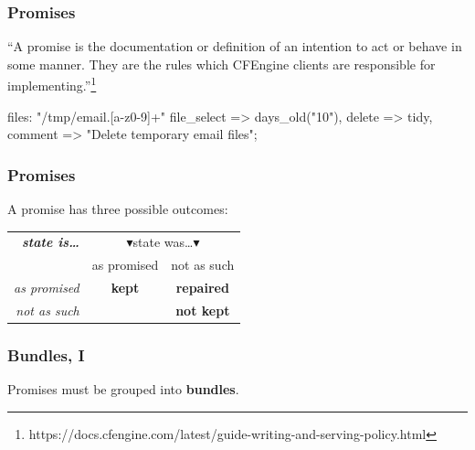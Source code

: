 \documentclass[english,serif,mathserif,usenames,dvipsnames]{beamer}
\begin{document}
\begin{frame}[fragile]
  \frametitle{Promises}
  ``A promise is the documentation or definition of an intention to
  act or behave in some manner. They are the rules which CFEngine
  clients are responsible for implementing.''\footnote{%
    https://docs.cfengine.com/latest/guide-writing-and-serving-policy.html
  }%

  \begin{semiverbatim}
files:
  \alert<2>{"/tmp/email.[a-z0-9]+"}
  \alert<3>{file_select   => days_old("10"),}
  \alert<4>{delete        => tidy,}
  comment       => "Delete temporary email files";
\end{semiverbatim}

\+
\end{frame}


\begin{frame}
  \frametitle{Promises}
  \begin{center}
    \newcommand\DN{$\blacktriangledown$}

    A promise has three possible outcomes:

    \+
    \begin{tabular}{>{\em}rcc}
    {\bf state is\ldots}    & \multicolumn{2}{c}{\DN state was\ldots \DN} \\
    \multicolumn{1}{c}{\DN} & as promised  & not as such                  \\
    as promised             & {\color{green}\bf kept}
                                           & {\color{violet}\bf repaired}   \\
    not as such             &              & {\color{red}\bf not kept}    \\
    \end{tabular}
  \end{center}
\end{frame}


\begin{frame}[fragile]
  \frametitle{Bundles, I}

  Promises must be grouped into \textbf{bundles}.


\end{frame}
\end{document}
